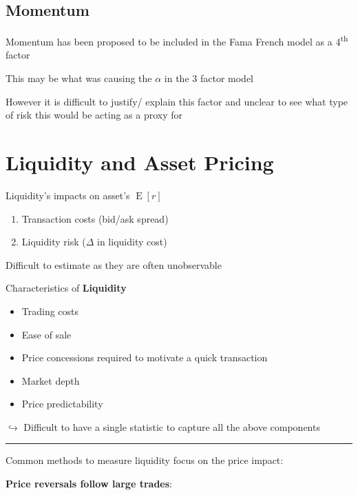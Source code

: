 \documentclass[]{book}
\providecommand{\tightlist}{%
  \setlength{\itemsep}{0pt}\setlength{\parskip}{0pt}}
\theoremstyle{definition}
\theoremstyle{definition}
\theoremstyle{remark}
\begin{document}
\subsection{Momentum}\label{momentum}

Momentum has been proposed to be included in the Fama French model as a
4\textsuperscript{th} factor

This may be what was causing the \(\alpha\) in the 3 factor model

However it is difficult to justify/ explain this factor and unclear to
see what type of risk this would be acting as a proxy for

\section{Liquidity and Asset Pricing}\label{liquidity-and-asset-pricing}

Liquidity's impacts on asset's \(\operatorname{E}[r]\)

\begin{enumerate}
\def\labelenumi{\arabic{enumi})}
\tightlist
\item
  Transaction costs (bid/ask spread)
\item
  Liquidity risk (\(\Delta\) in liquidity cost)
\end{enumerate}

Difficult to estimate as they are often unobservable

Characteristics of \textbf{Liquidity}

\begin{itemize}
\tightlist
\item
  Trading costs
\item
  Ease of sale
\item
  Price concessions required to motivate a quick transaction
\item
  Market depth
\item
  Price predictability
\end{itemize}

\(\hookrightarrow\) Difficult to have a single statistic to capture all
the above components

\begin{center}\rule{0.5\linewidth}{\linethickness}\end{center}

Common methods to measure liquidity focus on the price impact:

\textbf{Price reversals follow large trades}:
\end{document}
